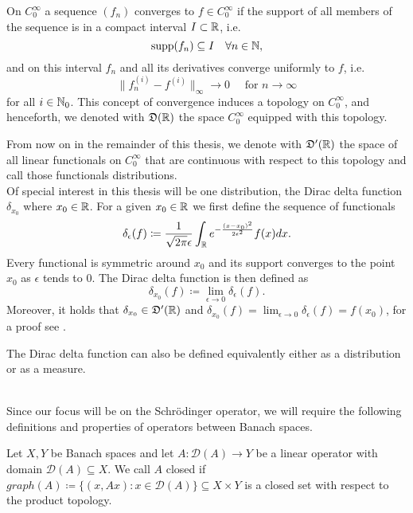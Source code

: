 \begin{definition}[Distributions]
	On $C_{0}^{\infty}$ a sequence $(f_{n})$ converges to $f \in C_{0}^{\infty}$ if the support of all members of the sequence is in a compact interval $I \subset \mathbb{R}$, i.e.
	$$ \operatorname{supp} (f_{n}) \subseteq I \quad \forall n \in \mathbb{N}, $$
	and on this interval $f_{n}$ and all its derivatives converge uniformly to $f$, i.e.
	\[ \| f_{n}^{(i)} - f^{(i)} \|_{\infty} \rightarrow 0 \quad \text{ for } n \rightarrow \infty \]
	for all $i \in \mathbb{N}_{0}$. This concept of convergence induces a topology on $C_{0}^{\infty}$, and henceforth, we denoted with $\mathfrak{D}(\mathbb{R})$ the space $C_{0}^{\infty}$ equipped with this topology.
\end{definition}

From now on in the remainder of this thesis, we denote with $\mathfrak{D}'(\mathbb{R})$ the space of all linear functionals on $C_{0}^{\infty}$ that are continuous with respect to this topology and call those functionals distributions. 
~\\

Of special interest in this thesis will be one distribution, the Dirac delta function $\delta_{x_{0}}$ where $x_{0} \in \mathbb{R}$. For a given $x_{0} \in \mathbb{R}$ we first define the sequence of functionals
	\begin{equation}
		\delta_{\epsilon}(f) \coloneqq \frac{1}{\sqrt{2 \pi} \epsilon} \int_{\mathbb{R}} e^{-\frac{(x - x_{0})^{2}}{2 \epsilon^{2}}} f(x) dx. \label{eq:2.1-smooth_potential}
	\end{equation}
 	Every functional is symmetric around $x_{0}$ and its support converges to the point $x_{0}$ as $\epsilon$ tends to $0$. The Dirac delta function is then defined as
 	\[ \delta_{x_{0}}(f) \coloneqq \lim_{\epsilon \rightarrow 0} \delta_{\epsilon}(f). \]
 	Moreover, it holds that $\delta_{x_{0}} \in \mathfrak{D}'(\mathbb{R})$ and $\delta_{x_{0}}(f) = \lim_{\epsilon \rightarrow 0} \delta_{\epsilon}(f) = f(x_{0})$, for a proof see \cite[Chap. 1.4]{weis2015spektheo}.
 	\begin{remark}
 		 The Dirac delta function can also be defined equivalently either as a distribution or as a measure.
 	\end{remark}
~\\
Since our focus will be on the Schrödinger operator, we will require the following definitions and properties of operators between Banach spaces.
\begin{definition} 
Let $X, Y$ be Banach spaces and let $A \colon \mathcal{D}(A) \rightarrow Y$ be a linear operator with domain $\mathcal{D}(A) \subseteq X$. We call $A$ closed if $graph(A) \coloneqq \{ (x, Ax) : x \in \mathcal{D}(A) \} \subseteq X \times Y$ is a closed set with respect to the product topology.
\end{definition}

